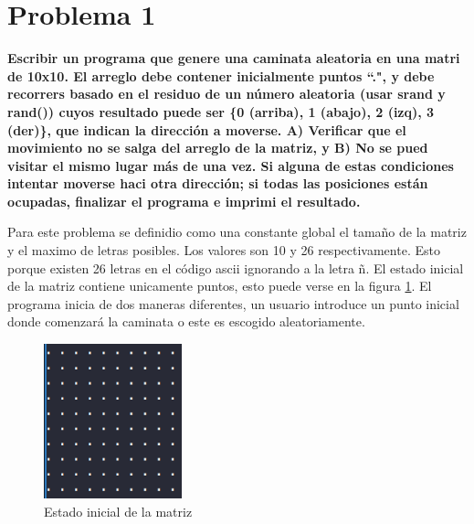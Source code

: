 \section*{Problema 1}
\textbf{Escribir un programa que genere una caminata aleatoria en una matri de 10x10. El arreglo debe contener inicialmente puntos ``.", y debe recorrers basado en el residuo de un número aleatoria (usar srand y rand()) cuyos resultado puede ser \{0 (arriba), 1 (abajo), 2 (izq), 3 (der)\}, que indican la dirección a moverse. A) Verificar que el movimiento no se salga del arreglo de la matriz, y B) No se pued visitar el mismo lugar más de una vez. Si alguna de estas condiciones intentar moverse haci otra dirección; si todas las posiciones están ocupadas, finalizar el programa e imprimi el resultado.}

Para este problema se definidio como una constante global el tamaño de la matriz y el maximo de letras posibles. Los valores son 10 y 26 respectivamente. Esto porque existen 26 letras en el código ascii ignorando a la letra ñ. El estado inicial de la matriz contiene unicamente puntos, esto puede verse en la figura \ref{fig:initial_state_problem1}. El programa inicia de dos maneras diferentes, un usuario introduce un punto inicial donde comenzará la caminata o este es escogido aleatoriamente.

\begin{figure}[H]
    \centering
    \includegraphics[width=4cm]{Graphics/initial_problem1.png}
    \caption{Estado inicial de la matriz}
    \label{fig:initial_state_problem1}
\end{figure}

